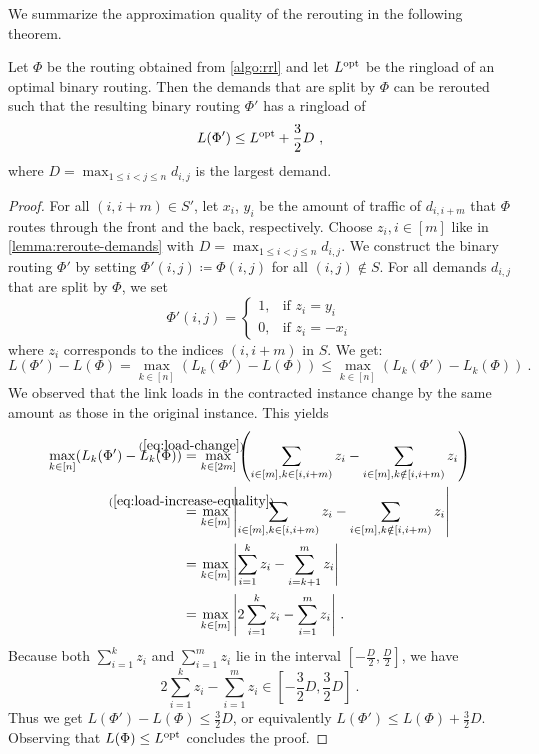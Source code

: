 We summarize the approximation quality of the rerouting in the following theorem.
\begin{theorem}
	\label{theo:ring-loading-algorithm}
	Let $\Phi$ be the routing obtained from \cref{algo:rrl} and let $L^{\mathrm{opt}}$ be the ringload of an optimal binary routing.
	Then the demands that are split by $\Phi$ can be rerouted such that the resulting binary routing $\Phi'$ has a ringload of
	\begin{equation}
		L(\Phi') \leq L^{\mathrm{opt}} + \frac{3}{2}D \ ,
	\end{equation}
	where $D = \max_{1 \leq i < j \leq n} d_{i, j}$ is the largest demand.
\end{theorem}
\begin{proof}
	For all $(i, i+m) \in S'$, let $x_i$, $y_i$ be the amount of traffic of $d_{i, i+m}$ that $\Phi$ routes through the front and the back, respectively.
	Choose $z_i, i \in [m]$ like in \cref{lemma:reroute-demands} with $D = \max_{1 \leq i < j \leq n} d_{i, j}$.
	We construct the binary routing $\Phi'$ by setting $\Phi'(i, j) \coloneqq \Phi(i, j)$ for all $(i, j) \notin S$.
	For all demands $d_{i, j}$ that are split by $\Phi$, we set
	\begin{equation}
		\Phi'(i, j) = \begin{cases}
			1, & \text{if } z_i = y_i \\
			0, & \text{if } z_i = -x_i
		\end{cases}
	\end{equation}
	where $z_i$ corresponds to the indices $(i, i+m)$ in $S$.
	We get:
	\begin{equation}
		L(\Phi') - L(\Phi) 
		= \max_{k \in [n]} (L_k(\Phi') - L(\Phi)) 
		\leq \max_{k \in [n]} (L_k(\Phi') - L_k(\Phi)) \ .
	\end{equation}
	We observed that the link loads in the contracted instance change by the same amount as those in the original instance.
	This yields
	\begin{align}
		\max_{k \in [n]} (L_k(\Phi') - L_k(\Phi)) 
		&\stackrel{\mathclap{(\ref{eq:load-change})}}{=} \max_{k \in [2m]} \left(\sum_{\substack{i \in [m], k \in [i, i+m)}} z_i - \sum_{\substack{i \in [m], k \notin[i, i+m)}} z_i \right)\\
		&\stackrel{\mathclap{(\ref{eq:load-increase-equality})}}{=} \max_{k \in [m]} \abs{\sum_{\substack{i \in [m], k \in [i, i+m)}} z_i - \sum_{\substack{i \in [m], k \notin[i, i+m)}} z_i} \\
		& = \max_{k \in [m]} \abs{\sum_{i = 1}^k z_i - \sum_{i = k+1}^m z_i }\\
		& = \max_{k \in [m]} \abs{2\sum_{i = 1}^k z_i - \sum_{i = 1}^m z_i } \ . \label{eq:partial-reroutes}
	\end{align}
	Because both $\sum_{i = 1}^k z_i$ and $\sum_{i = 1}^m z_i$ lie in the interval $[-\frac{D}{2}, \frac{D}{2}]$, 
	we have 
	\begin{equation}
		2\sum_{i = 1}^k z_i - \sum_{i = 1}^m z_i \in [-\frac{3}{2}D, \frac{3}{2}D] \ .
	\end{equation}
	Thus we get $L(\Phi') - L(\Phi) \leq \frac{3}{2}D$, or equivalently $L(\Phi') \leq L(\Phi) + \frac{3}{2}D$.
	Observing that $L(\Phi) \leq L^{\mathrm{opt}}$ concludes the proof.
\end{proof}

